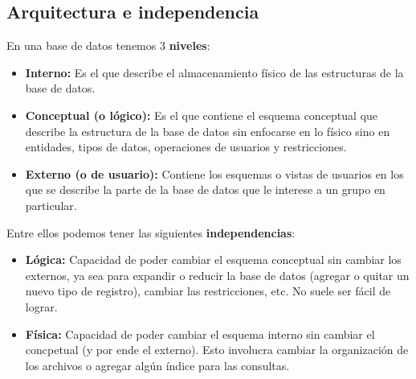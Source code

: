 \subsection*{Arquitectura e independencia}
En una base de datos tenemos 3 \textbf{niveles}:
\begin{itemize}
    \item \textbf{Interno:} Es el que describe el almacenamiento físico de las estructuras de la base de datos.
    \item \textbf{Conceptual (o lógico):} Es el que contiene el esquema conceptual que describe la estructura de la base de datos sin enfocarse en lo físico sino en entidades, tipos de datos, operaciones de usuarios y restricciones.
    \item \textbf{Externo (o de usuario):} Contiene los esquemas o vistas de usuarios en los que se describe la parte de la base de datos que le interese a un grupo en particular.
\end{itemize}
Entre ellos podemos tener las siguientes \textbf{independencias}:
\begin{itemize}
    \item \textbf{Lógica:} Capacidad de poder cambiar el esquema conceptual sin cambiar los externos, ya sea para expandir o reducir la base de datos  (agregar o quitar un nuevo tipo de registro), cambiar las restricciones, etc. No suele ser fácil de lograr.
    \item \textbf{Física:} Capacidad de poder cambiar el esquema interno sin cambiar el concpetual (y por ende el externo). Esto involucra cambiar la organización de los archivos o agregar algún índice para las consultas.
\end{itemize}
